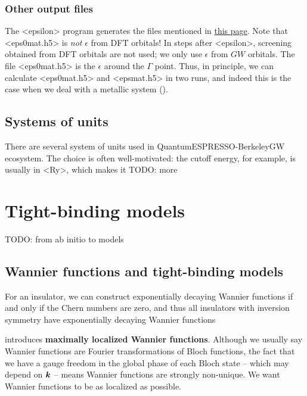 \documentclass[hyperref, a4paper, 12pt]{report}
\newcommand*{\concept}[1]{{\textbf{#1}}}
\def\ce#1{<#1>}%
\def\texttt#1{<#1>}%
\newcommand{\shortcode}[1]{\texttt{#1}}
\begin{document}
\subsection{Other output files}

The \shortcode{epsilon} program generates the files mentioned in 
\href{http://manual.berkeleygw.org/2.0/epsilon-overview/}{this page}.
Note that \shortcode{eps0mat.h5} is \emph{not} $\epsilon$ from DFT orbitals!
In steps after \shortcode{epsilon},
screening obtained from DFT orbitals are not used;
we only use $\epsilon$ from $GW$ orbitals.
The file \shortcode{eps0mat.h5} is the $\epsilon$ around the $\Gamma$ point.
Thus, in principle,
we can calculate \shortcode{eps0mat.h5} and \shortcode{epsmat.h5}
in two runs,
and indeed this is the case when we deal with a metallic system
().

\section{Systems of units}

There are several system of units used in QuantumESPRESSO-BerkeleyGW ecosystem.
The choice is often well-motivated: 
the cutoff energy, for example, 
is usually in \ce{Ry},
which makes it TODO: more

\chapter{Tight-binding models}

TODO: from ab initio to models

\section{Wannier functions and tight-binding models}

For an insulator,
we can construct exponentially decaying Wannier functions 
if and only if the Chern numbers are zero, 
and thus all insulators with inversion symmetry 
have exponentially decaying Wannier functions \cite{brouder2007exponential}

\cite{marzari2012maximally} introduces \concept{maximally localized Wannier functions}.
Although we usually say Wannier functions are Fourier transformations of Bloch functions,
the fact that we have a gauge freedom in the global phase of each Bloch state
-- which may depend on $\vb*{k}$ --  
means Wannier functions are strongly non-unique.
We want Wannier functions to be as localized as possible. 
\end{document}
